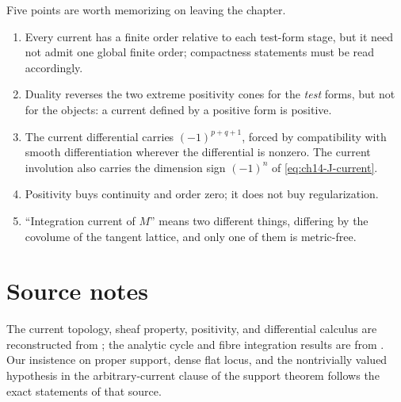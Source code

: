 Five points are worth memorizing on leaving the chapter.
\begin{enumerate}
\item Every current has a finite order relative to each test-form stage, but
  it need not admit one global finite order; compactness statements must be
  read accordingly.
\item Duality reverses the two extreme positivity cones for the \emph{test}
  forms, but not for the objects: a current defined by a positive form is
  positive.
\item The current differential carries $(-1)^{p+q+1}$, forced by
  compatibility with smooth differentiation wherever the differential
  is nonzero. The current involution also carries the dimension sign
  $(-1)^n$ of \eqref{eq:ch14-J-current}.
\item Positivity buys continuity and order zero; it does not buy
  regularization.
\item ``Integration current of $M$'' means two different things, differing by
  the covolume of the tangent lattice, and only one of them is metric-free.
\end{enumerate}

\section*{Source notes}

The current topology, sheaf property, positivity, and differential calculus
are reconstructed from \cite[Chapter~7]{CLD25}; the analytic cycle and fibre
integration results are from \cite[Chapter~16]{CLD25}.  Our insistence on
proper support, dense flat locus, and the nontrivially valued hypothesis in
the arbitrary-current clause of the support theorem follows the exact
statements of that source.

